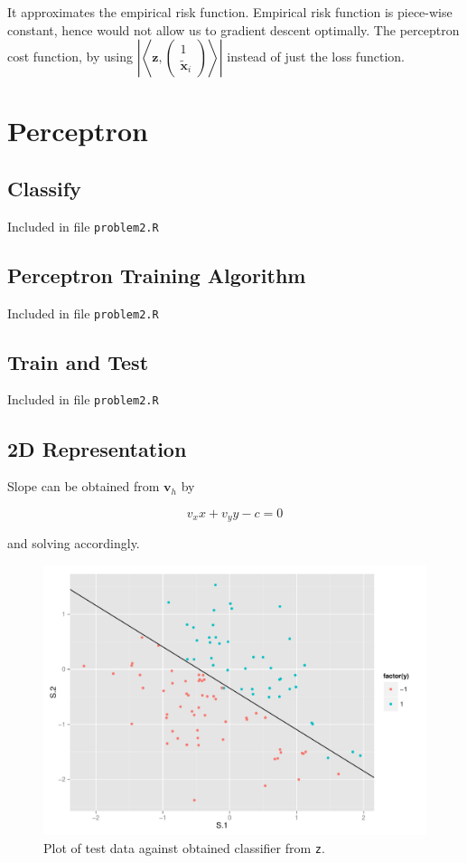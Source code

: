 \documentclass[11pt]{scrartcl}
\begin{document}
It approximates the empirical risk function. Empirical risk function is piece-wise constant, hence would not allow us to gradient descent optimally. The perceptron cost function, by using $\left|\left<\mathbf{z} ,\begin{pmatrix}1 \\ \tilde{\mathbf{x}}_i \end{pmatrix}\right>\right|$ instead of just the loss function.

\section{Perceptron}

\subsection{Classify}

Included in file \texttt{problem2.R}

\subsection{Perceptron Training Algorithm}

Included in file \texttt{problem2.R}

\subsection{Train and Test}

Included in file \texttt{problem2.R}

\subsection{2D Representation}

Slope can be obtained from $\mathbf{v}_h$ by

\[v_x x + v_y y - c = 0\]

and solving accordingly.

\begin{figure}[H]
\centering\includegraphics[width=\textwidth]{./hw2/r/test.pdf}
\caption{Plot of test data against obtained classifier from \texttt{z}.}
\end{figure}
\end{document}
